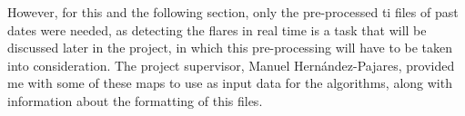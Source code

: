 However, for this and the following section, only the pre-processed ti files of past dates were needed, as detecting the flares in real time is a task that will be discussed later in the project, in which this pre-processing will have to be taken into consideration. The project supervisor, Manuel Hernández-Pajares, provided me with some of these maps to use as input data for the algorithms, along with information about the formatting of this files.


